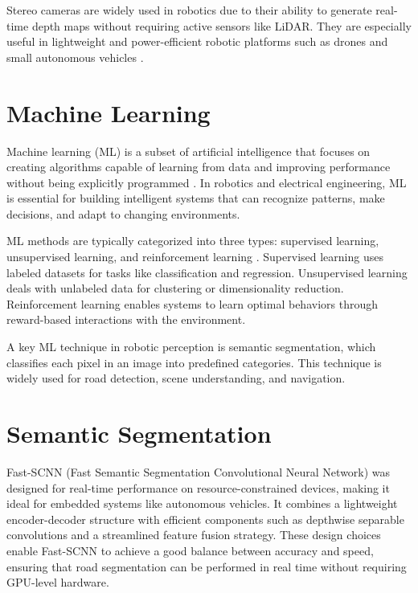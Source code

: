 \par
Stereo cameras are widely used in robotics due to their ability to generate real-time depth maps without requiring active sensors like LiDAR. They are especially useful in lightweight and power-efficient robotic platforms such as drones and small autonomous vehicles \cite{khoshelham2012accuracy}.

\section{Machine Learning}
Machine learning (ML) is a subset of artificial intelligence that focuses on creating algorithms capable of learning from data and improving performance without being explicitly programmed \cite{mitchell1997machine}. In robotics and electrical engineering, ML is essential for building intelligent systems that can recognize patterns, make decisions, and adapt to changing environments.

\par
ML methods are typically categorized into three types: supervised learning, unsupervised learning, and reinforcement learning \cite{goodfellow2016deep}. Supervised learning uses labeled datasets for tasks like classification and regression. Unsupervised learning deals with unlabeled data for clustering or dimensionality reduction. Reinforcement learning enables systems to learn optimal behaviors through reward-based interactions with the environment.

\par
A key ML technique in robotic perception is semantic segmentation, which classifies each pixel in an image into predefined categories. This technique is widely used for road detection, scene understanding, and navigation.

\section{Semantic Segmentation}

Fast-SCNN (Fast Semantic Segmentation Convolutional Neural Network) was designed for real-time performance on resource-constrained devices, making it ideal for embedded systems like autonomous vehicles. It combines a lightweight encoder-decoder structure with efficient components such as depthwise separable convolutions and a streamlined feature fusion strategy. These design choices enable Fast-SCNN to achieve a good balance between accuracy and speed, ensuring that road segmentation can be performed in real time without requiring GPU-level hardware.

